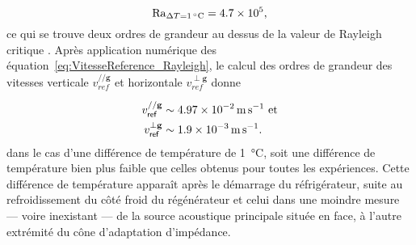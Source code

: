 \begin{equation}
	\Rayleigh_{\Delta T=\qty{1}{\degreeCelsius}}=\num{4.7e5},
	\label{eq:NbrRayleigh_Exple1K}
\end{equation}  
ce qui se trouve deux ordres de grandeur au dessus de la valeur de Rayleigh critique \cite{getling_rayleigh-benard_1998}. Après application numérique des équation~\eqref{eq:VitesseReference_Rayleigh}, le calcul des ordres de grandeur des vitesses verticale $v_{ref}^{// \mathbf g}$ et horizontale $v_{ref}^{\perp \mathbf g}$ donne

\begin{subequations}
	\begin{align}
		v_{\sf ref}^{// \mathbf g} &\sim \qty{4.97e-2}{\meter\per\second} \text{ et}	\label{eq:VitesseReferenceV_Rayleigh_Exple1K}\\
		v_{\sf ref}^{\perp \mathbf g} &\sim \qty{1.9e-3}{\meter\per\second}.	\label{eq:VitesseReferenceH_Rayleigh_Exple1K}
	\end{align}
	\label{eq:VitesseReference_Rayleigh_Exple5K}%
\end{subequations}
dans le cas d'une différence de température de \qty{1}{\degreeCelsius}, soit une différence de température bien plus faible que celles obtenus pour toutes les expériences. Cette différence de température apparaît après le démarrage du réfrigérateur, suite au refroidissement du côté froid du régénérateur et celui dans une moindre mesure --- voire inexistant --- de la source acoustique principale située en face, à l'autre extrémité du cône d'adaptation d'impédance.

